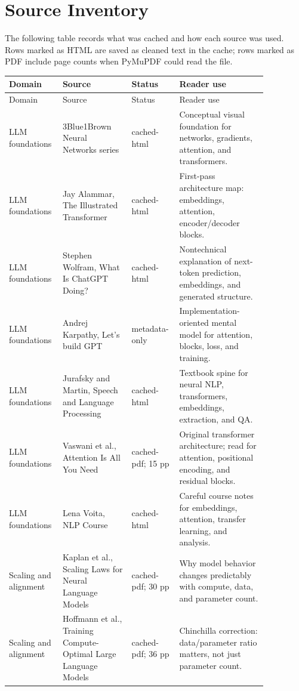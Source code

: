 \documentclass[11pt]{article}
\begin{document}
\section{Source Inventory}

The following table records what was cached and how each source was used.
Rows marked as HTML are saved as cleaned text in the cache; rows marked as PDF include page counts when PyMuPDF could read the file.

\small
\begin{longtable}{p{0.16\linewidth}p{0.25\linewidth}p{0.13\linewidth}p{0.32\linewidth}}
\toprule
Domain & Source & Status & Reader use \\
\midrule
\endfirsthead
\toprule
Domain & Source & Status & Reader use \\
\midrule
\endhead
LLM foundations & 3Blue1Brown Neural Networks series & cached-html & Conceptual visual foundation for networks, gradients, attention, and transformers. \\
LLM foundations & Jay Alammar, The Illustrated Transformer & cached-html & First-pass architecture map: embeddings, attention, encoder/decoder blocks. \\
LLM foundations & Stephen Wolfram, What Is ChatGPT Doing? & cached-html & Nontechnical explanation of next-token prediction, embeddings, and generated structure. \\
LLM foundations & Andrej Karpathy, Let's build GPT & metadata-only & Implementation-oriented mental model for attention, blocks, loss, and training. \\
LLM foundations & Jurafsky and Martin, Speech and Language Processing & cached-html & Textbook spine for neural NLP, transformers, embeddings, extraction, and QA. \\
LLM foundations & Vaswani et al., Attention Is All You Need & cached-pdf; 15 pp & Original transformer architecture; read for attention, positional encoding, and residual blocks. \\
LLM foundations & Lena Voita, NLP Course & cached-html & Careful course notes for embeddings, attention, transfer learning, and analysis. \\
Scaling and alignment & Kaplan et al., Scaling Laws for Neural Language Models & cached-pdf; 30 pp & Why model behavior changes predictably with compute, data, and parameter count. \\
Scaling and alignment & Hoffmann et al., Training Compute-Optimal Large Language Models & cached-pdf; 36 pp & Chinchilla correction: data/parameter ratio matters, not just parameter count. \\

\end{longtable}
\end{document}
